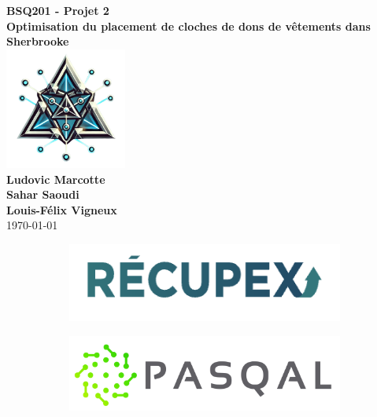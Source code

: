 \begin{titlepage}
    \begin{center}
        {\fontsize{20}{40} \selectfont \bfseries BSQ201 - Projet 2} \\\vspace{20pt} {\fontsize{20}{40} \selectfont \bfseries Optimisation du placement de cloches de dons de vêtements dans Sherbrooke}
        \\\vspace{120pt}
        \includegraphics[width=0.3\textwidth]{images/QLink_noback.png} 
        \\\vspace{10pt}
        \textbf{ Ludovic Marcotte  \\\vspace{8pt}
        Sahar Saoudi\\\vspace{8pt} Louis-Félix Vigneux\\\vspace{8pt}}
        \vspace{100pt}
        \today
        \vfill
        \begin{figure}[h]
             \centering
             \begin{subfigure}[b]{0.3\textwidth}
                 \centering
                 \includegraphics[width=\textwidth]{images/recupex_logo.png}
             \end{subfigure}
             \hfill
             \begin{subfigure}[b]{0.3\textwidth}
                 \centering
                 \includegraphics[width=\textwidth]{images/pasqal_logo.png}

\end{subfigure}
\end{figure}
\end{center}
\end{titlepage}
